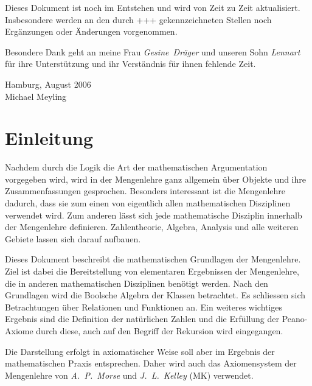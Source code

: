 \documentclass[a4paper,german,10pt,twoside]{book}
\theoremstyle{definition}
\theoremstyle{remark}
\begin{document}
\par
Dieses Dokument ist noch im Entstehen und wird von Zeit zu Zeit aktualisiert. Insbesondere werden an den durch {\glqq+++\grqq} gekennzeichneten Stellen noch Erg{\"a}nzungen oder {\"A}nderungen vorgenommen.

\par
Besondere Dank geht an meine Frau \emph{Gesine~Dr{\"a}ger} und unseren Sohn \emph{Lennart} f{\"u}r ihre Unterst{\"u}tzung und ihr Verst{\"a}ndnis f{\"u}r ihnen fehlende Zeit.

\par
\vspace*{1cm} Hamburg, August 2006 \\
\hspace*{\fill} Michael Meyling


\chapter*{Einleitung\label{ch:introduction}} \label{chapter1} \hypertarget{chapter1}{}

Nachdem durch die Logik die Art der mathematischen Argumentation vorgegeben wird, wird in der Mengenlehre ganz allgemein {\"u}ber Objekte und ihre Zusammenfassungen gesprochen. Besonders interessant ist die Mengenlehre dadurch, dass sie zum einen von eigentlich allen mathematischen Disziplinen verwendet wird. Zum anderen l{\"a}sst sich jede mathematische Disziplin innerhalb der Mengenlehre definieren. Zahlentheorie, Algebra, Analysis und alle weiteren Gebiete lassen sich darauf aufbauen.

  \par
  Dieses Dokument beschreibt die mathematischen Grundlagen der Mengenlehre. Ziel ist dabei die Bereitstellung von elementaren Ergebnissen der Mengenlehre, die in anderen mathematischen Disziplinen ben{\"o}tigt werden. Nach den Grundlagen wird die Boolsche Algebra der Klassen betrachtet. Es schliessen sich Betrachtungen {\"u}ber Relationen und Funktionen an. Ein weiteres wichtiges Ergebnis sind die Definition der nat{\"u}rlichen Zahlen und die Erf{\"u}llung der Peano-Axiome durch diese, auch auf den Begriff der Rekursion wird eingegangen.
 
  \par
  Die Darstellung erfolgt in axiomatischer Weise soll aber im Ergebnis der mathematischen Praxis entsprechen. Daher wird auch das Axiomensystem der Mengenlehre von \emph{A.~P.~Morse} und  \emph{J.~L.~Kelley} (MK) verwendet.
\end{document}
